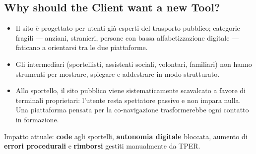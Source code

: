 \documentclass[11pt,a4paper]{article}
\begin{document}
\subsection{Why should the Client want a new Tool?}
\begin{itemize}[leftmargin=*]
    \item Il sito è progettato per utenti già esperti del trasporto pubblico;
    categorie fragili --- anziani, stranieri, persone con bassa alfabetizzazione
    digitale --- faticano a orientarsi tra le due piattaforme.
    \item Gli intermediari (sportellisti, assistenti sociali, volontari,
    familiari) non hanno strumenti per mostrare, spiegare e addestrare in
    modo strutturato.
    \item Allo sportello, il sito pubblico viene sistematicamente scavalcato
    a favore di terminali proprietari: l'utente resta spettatore passivo e
    non impara nulla. Una piattaforma pensata per la co-navigazione
    trasformerebbe ogni contatto in formazione.
\end{itemize}
Impatto attuale: \textbf{code} agli sportelli, \textbf{autonomia digitale}
bloccata, aumento di \textbf{errori procedurali} e \textbf{rimborsi} gestiti
manualmente da TPER.
\end{document}
